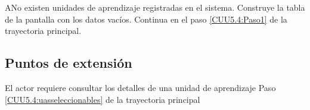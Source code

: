 	\begin{UCtrayectoriaA}{A}{No existen unidades de aprendizaje registradas en el sistema.}
		\UCpaso[\UCsist] Construye la tabla de la pantalla   con los datos vacíos.
		\UCpaso[] Continua en el paso \ref{CUU5.4:Paso1} de la trayectoria principal.
	\end{UCtrayectoriaA}
	
	\subsection{Puntos de extensión}
	
	\UCExtensionPoint
	{El actor requiere consultar los detalles de una unidad de aprendizaje}
	{ Paso \ref{CUU5.4:uasseleccionables} de la trayectoria principal}
	{}
	

	
	
	
	
